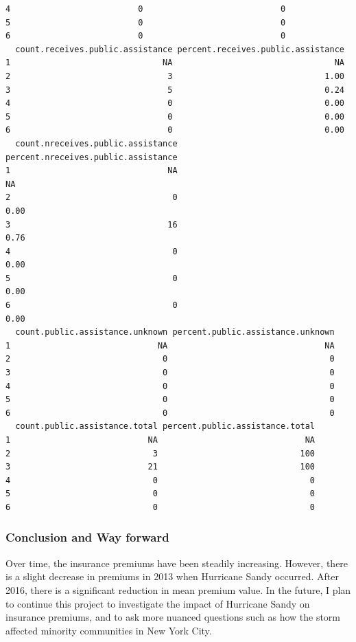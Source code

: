 \documentclass[
  letterpaper,
  DIV=11,
  numbers=noendperiod]{scrartcl}
\begin{document}
\begin{verbatim}
4                          0                            0
5                          0                            0
6                          0                            0
  count.receives.public.assistance percent.receives.public.assistance
1                               NA                                 NA
2                                3                               1.00
3                                5                               0.24
4                                0                               0.00
5                                0                               0.00
6                                0                               0.00
  count.nreceives.public.assistance percent.nreceives.public.assistance
1                                NA                                  NA
2                                 0                                0.00
3                                16                                0.76
4                                 0                                0.00
5                                 0                                0.00
6                                 0                                0.00
  count.public.assistance.unknown percent.public.assistance.unknown
1                              NA                                NA
2                               0                                 0
3                               0                                 0
4                               0                                 0
5                               0                                 0
6                               0                                 0
  count.public.assistance.total percent.public.assistance.total
1                            NA                              NA
2                             3                             100
3                            21                             100
4                             0                               0
5                             0                               0
6                             0                               0
\end{verbatim}

\hypertarget{conclusion-and-way-forward}{%
\subsubsection{Conclusion and Way
forward}\label{conclusion-and-way-forward}}

Over time, the insurance premiums have been steadily increasing.
However, there is a slight decrease in premiums in 2013 when Hurricane
Sandy occurred. After 2016, there is a significant reduction in mean
premium value. In the future, I plan to continue this project to
investigate the impact of Hurricane Sandy on insurance premiums, and to
ask more nuanced questions such as how the storm affected minority
communities in New York City.
\end{document}
